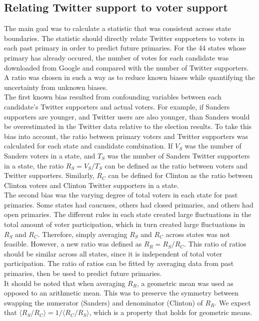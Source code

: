 \documentclass[12pt]{extarticle}
\begin{document}
\subsection{Relating Twitter support to voter support}
The main goal was to calculate a statistic that was consistent across state boundaries.
The statistic should directly relate Twitter supporters to voters in each past primary in order to predict future primaries.
For the 44 states whose primary has already occured, the number of votes for each candidate was downloaded from Google and compared with the number of Twitter supporters.
A ratio was chosen in such a way as to reduce known biases while quantifying the uncertainty from unknown biases.
\\
\indent
The first known bias resulted from confounding variables between each candidate's Twitter supporters and actual voters.
For example, if Sanders supporters are younger, and Twitter users are also younger, than Sanders would be overestimated in the Twitter data relative to the election results.
To take this bias into account, the ratio between primary voters and Twitter supporters was calculated for each state and candidate combination.
If $V_S$ was the number of Sanders voters in a state, and $T_S$ was the number of Sanders Twitter supporters in a state, the ratio $R_S = V_S / T_S$ can be defined as the ratio between voters and Twitter supporters.
Similarly, $R_C$ can be defined for Clinton as the ratio between Clinton voters and Clinton Twitter supporters in a state.
\\
\indent
The second bias was the varying degree of total voters in each state for past primaries.
Some states had caucuses, others had closed primaries, and others had open primaries.
The different rules in each state created large fluctuations in the total amount of voter participation, which in turn created large fluctuations in $R_S$ and $R_C$.
Therefore, simply averaging $R_S$ and $R_C$ across states was not feasible.
However, a new ratio was defined as $R_R = R_S / R_C$.
This ratio of ratios should be similar across all states, since it is independent of total voter participation.
The ratio of ratios can be fitted by averaging data from past primaries, then be used to predict future primaries.
\\
\indent
It should be noted that when averaging $R_R$, a geometric mean was used as opposed to an arithmetic mean.
This was to preserve the symmetry between swapping the numerator (Sanders) and denominator (Clinton) of $R_R$.
We expect that $\langle R_S/R_C \rangle = 1 / \langle R_C/R_S \rangle$, which is a property that holds for geometric means.
\end{document}
